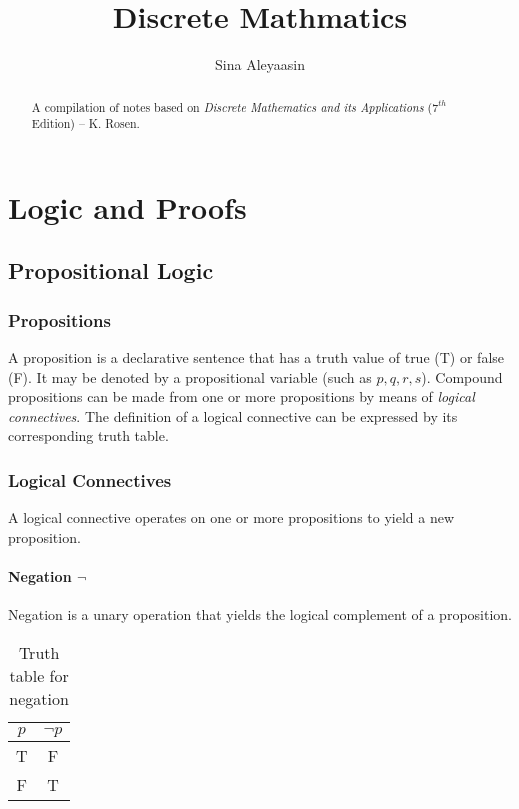 \documentclass[twocolumn]{report}
\title{Discrete Mathmatics}
\author{Sina Aleyaasin}
\begin{document}
\begin{titlingpage}
	\maketitle
	\begin{abstract}
		A compilation of notes based on \textit{Discrete Mathematics and its Applications} ($7^{th}$ Edition) -- K. Rosen. 
	\end{abstract}
\end{titlingpage}
\tableofcontents
\chapter{Logic and Proofs}
\section{Propositional Logic}
\subsection{Propositions}
A proposition is a declarative sentence that has a truth value of true (T) or false (F). 
It may be denoted by a propositional variable (such as $p, q, r, s$). 
Compound propositions can be made from one or more propositions by means of \textit{logical connectives}. 
The definition of a logical connective can be expressed by its corresponding truth table.

\subsection{Logical Connectives}
A logical connective operates on one or more propositions to yield a new proposition.

\subsubsection{Negation $\neg$}
Negation is a unary operation that yields the logical complement of a proposition.
\begin{table}[h]
\centering
\label{tab: negation-truth-table}
\begin{tabular}{cc}
$p$ & $\neg p$ \\ \hline
T & F     \\
F & T    
\end{tabular}
\caption{Truth table for negation}
\end{table}
\end{document}
